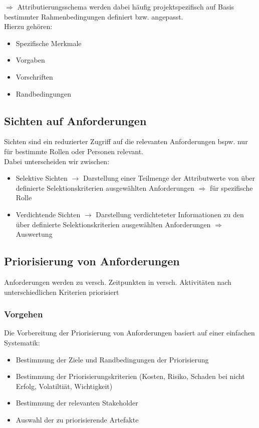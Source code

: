 \documentclass{report}
\theoremstyle{definition}
\theoremstyle{example}
\begin{document}
$\Rightarrow$ Attributierungsschema werden dabei häufig projektspezifisch auf Basis bestimmter Rahmenbedingungen definiert bzw. angepasst. \\
Hierzu gehören:
\begin{itemize}
   \item Spezifische Merkmale
   \item Vorgaben
   \item Vorschriften
   \item Randbedingungen
\end{itemize}


\subsection{Sichten auf Anforderungen}
Sichten sind ein reduzierter Zugriff auf die relevanten Anforderungen bspw. nur für bestimmte Rollen oder Personen relevant. \\
Dabei unterscheiden wir zwischen:
\begin{itemize}
   \item Selektive Sichten $\rightarrow$ Darstellung einer Teilmenge der Attributwerte von über definierte Selektionskriterien ausgewählten Anforderungen $\Rightarrow$ für spezifische Rolle
   \item Verdichtende Sichten $\rightarrow$ Darstellung verdichteteter Informationen zu den über definierte Selektionskriterien ausgewählten Anforderungen $\Rightarrow$ Auswertung
\end{itemize}

\subsection{Priorisierung von Anforderungen}
Anforderungen werden zu versch. Zeitpunkten in versch. Aktivitäten nach unterschiedlichen Kriterien priorisiert

\subsubsection{Vorgehen}
Die Vorbereitung der Priorisierung von Anforderungen basiert auf einer einfachen Systematik:
\begin{itemize}
   \item Bestimmung der Ziele und Randbedingungen der Priorisierung
   \item Bestimmung der Priorisierungskriterien (Kosten, Risiko, Schaden bei nicht Erfolg, Volatiltiät, Wichtigkeit)
   \item Bestimmung der relevanten Stakeholder
   \item Auswahl der zu priorisierende Artefakte
\end{itemize}
\end{document}
